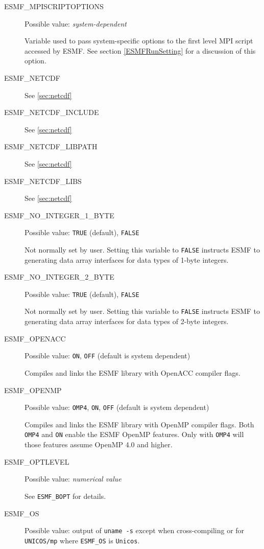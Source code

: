 \begin{description}
\item[ESMF\_MPISCRIPTOPTIONS]
Possible value: {\em system-dependent}

Variable used to pass system-specific options to the first level MPI script
accessed by ESMF.
See section \ref{ESMFRunSetting} for a discussion of this option.

\item[ESMF\_NETCDF]
See \ref{sec:netcdf}

\item[ESMF\_NETCDF\_INCLUDE]
See \ref{sec:netcdf}

\item[ESMF\_NETCDF\_LIBPATH]
See \ref{sec:netcdf}

\item[ESMF\_NETCDF\_LIBS]
See \ref{sec:netcdf}

\item[ESMF\_NO\_INTEGER\_1\_BYTE]
Possible value: {\tt TRUE} (default), {\tt FALSE}

Not normally set by user. Setting this variable to {\tt FALSE} instructs
ESMF to generating data array interfaces for data types of 1-byte integers.

\item[ESMF\_NO\_INTEGER\_2\_BYTE]
Possible value: {\tt TRUE} (default), {\tt FALSE}

Not normally set by user. Setting this variable to {\tt FALSE} instructs
ESMF to generating data array interfaces for data types of 2-byte integers.

\item[ESMF\_OPENACC]
Possible value: {\tt ON}, {\tt OFF} (default is system dependent)

Compiles and links the ESMF library with OpenACC compiler flags.

\item[ESMF\_OPENMP]
Possible value: {\tt OMP4}, {\tt ON}, {\tt OFF} (default is system dependent)

Compiles and links the ESMF library with OpenMP compiler flags.
Both {\tt OMP4} and {\tt ON} enable the ESMF OpenMP features. Only with
{\tt OMP4} will those features assume OpenMP 4.0 and higher.

\item[ESMF\_OPTLEVEL]
Possible value: {\em numerical value}

See {\tt ESMF\_BOPT} for details.

\item[ESMF\_OS]
Possible value: output of {\tt uname -s} except when cross-compiling or for
{\tt UNICOS/mp} where {\tt ESMF\_OS} is {\tt Unicos}.


\end{description}
